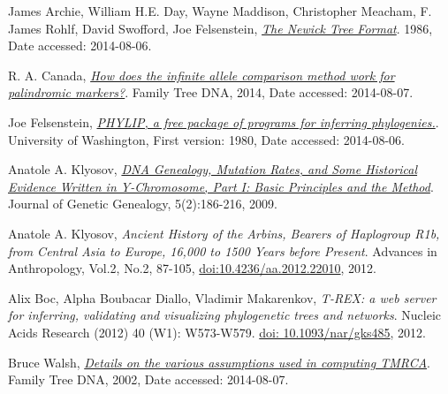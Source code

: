 \raggedright
\begin{thebibliography}{bla}


 James Archie, William H.E. Day, Wayne Maddison,
Christopher Meacham, F. James Rohlf, David Swofford, Joe Felsenstein,
\emph{\href{http://evolution.genetics.washington.edu/phylip/newicktree.html}
{The Newick Tree Format}}.
1986, Date accessed: 2014-08-06.

 R. A. Canada,
\emph{\href{https://www.familytreedna.com/learn/y-dna-testing/y-str/infinite-allele-palindromic-markers/}
{How does the infinite allele comparison method work for palindromic markers?}}.
Family Tree DNA, 2014, Date accessed: 2014-08-07.

 Joe Felsenstein,
\emph{\href{http://evolution.genetics.washington.edu/phylip.html}
{PHYLIP, a free package of programs for inferring phylogenies.}}.
University of Washington, First version: 1980, Date accessed: 2014-08-06.

 Anatole A. Klyosov,
\emph{\href{http://www.jogg.info/52/files/Klyosov1.pdf}
{DNA Genealogy, Mutation Rates, and Some Historical
Evidence Written in Y-Chromosome, Part I:  Basic Principles and
the Method}}.
Journal of Genetic Genealogy, 5(2):186-216, 2009.

 Anatole A. Klyosov,
\emph{Ancient History of the Arbins, Bearers of Haplogroup R1b, from
Central Asia to Europe, 16,000 to 1500 Years before Present}.
Advances in Anthropology, Vol.2, No.2, 87-105,
\href{http://dx.doi.org/10.4236/aa.2012.22010}{doi:10.4236/aa.2012.22010}, 2012.

 Alix Boc, Alpha Boubacar Diallo, Vladimir Makarenkov,
\emph{T-REX: a web server for inferring, validating and
visualizing phylogenetic trees and networks}.
Nucleic Acids Research (2012) 40 (W1): W573-W579.
\href{http://dx.doi.org/10.1093/nar/gks485}{doi: 10.1093/nar/gks485}, 2012. 

 Bruce Walsh,
\emph{\href{http://nitro.biosci.arizona.edu/ftDNA/models.html}
{Details on the various assumptions used in computing TMRCA}}.
Family Tree DNA, 2002, Date accessed: 2014-08-07.

\end{thebibliography}
